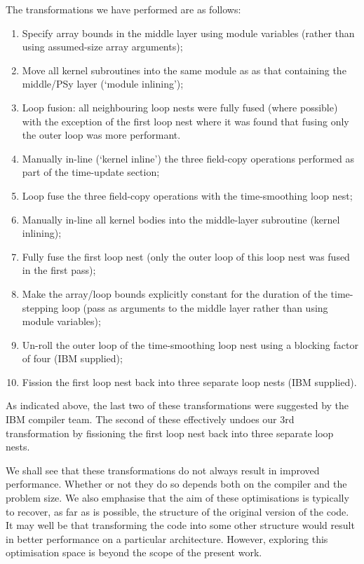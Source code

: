 \documentclass{IOS-Book-Article}
\begin{document}
The transformations we have performed are as follows:
\begin{enumerate}

\item Specify array bounds in the middle layer using module variables
  (rather than using assumed-size array arguments);

\item Move all kernel subroutines into the same module as as that
  containing the middle/PSy layer (`module inlining');

\item Loop fusion: all neighbouring loop nests were fully fused (where
  possible) with the exception of the first loop nest where it was
  found that fusing only the outer loop was more performant.

\item Manually in-line (`kernel inline') the three field-copy operations
  performed as part of the time-update section;

\item Loop fuse the three field-copy operations with the
  time-smoothing loop nest;

\item Manually in-line all kernel bodies into the middle-layer
  subroutine (kernel inlining);

\item Fully fuse the first loop nest (only the outer loop of this loop
  nest was fused in the first pass);

\item Make the array/loop bounds explicitly constant for the duration
  of the time-stepping loop (pass as arguments to the middle layer
  rather than using module variables);

\item Un-roll the outer loop of the time-smoothing loop nest using a
blocking factor of four (IBM supplied);

\item Fission the first loop nest back into three separate loop nests
  (IBM supplied).

\end{enumerate}

As indicated above, the last two of these transformations were
suggested by the IBM compiler team. The second of these effectively
undoes our 3rd transformation by fissioning the first loop nest back
into three separate loop nests.

We shall see that these transformations do not always result in improved
performance. Whether or not they do so depends both on the compiler
and the problem size. We also emphasise that the aim of these
optimisations is typically to recover, as far as is possible, the structure of
the original version of the code. It may well be that transforming the
code into some other structure would result in better performance on a
particular architecture. However, exploring this optimisation space is
beyond the scope of the present work.
\end{document}
